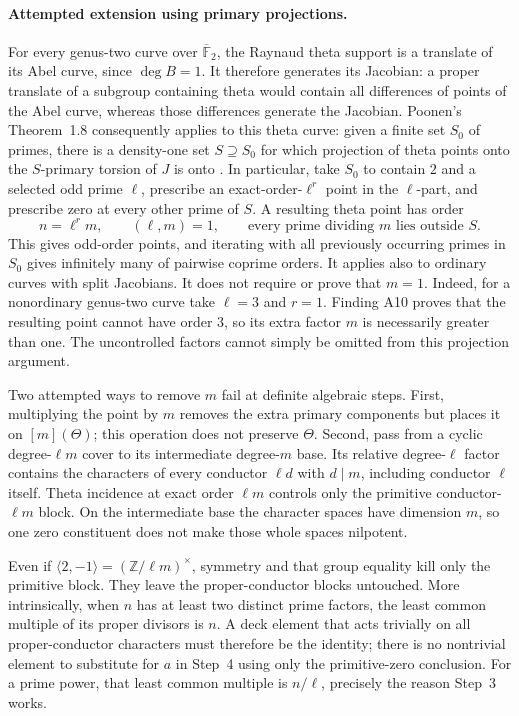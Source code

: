 \documentclass[11pt,a4paper]{article}
\begin{document}
\paragraph{Attempted extension using primary projections.}
For every genus-two curve over $\overline{\mathbb F}_2$, the
Raynaud theta support is a translate of its Abel curve, since
$\deg B=1$. It therefore generates its Jacobian: a proper translate
of a subgroup containing theta would contain all differences of
points of the Abel curve, whereas those differences generate the
Jacobian.
Poonen's Theorem~1.8 consequently applies to this theta curve:
given a finite set $S_0$ of primes, there is a density-one set
$S\supseteq S_0$ for which projection of theta points onto the
$S$-primary torsion of $J$ is onto \cite[Theorem~1.8]{Poonen2005}.
In particular, take $S_0$ to contain $2$ and a selected odd prime
$\ell$, prescribe an exact-order-$\ell^r$ point in the $\ell$-part,
and prescribe zero at every other prime of $S$. A resulting theta
point has order
\[
 n=\ell^r m,\qquad (\ell,m)=1,\qquad
 \text{every prime dividing }m\text{ lies outside }S.
 \tag{PR.9}
\]
This gives odd-order points, and iterating with all previously
occurring primes in $S_0$ gives infinitely many of pairwise coprime
orders. It applies also to ordinary curves with split Jacobians.
It does not require or prove that $m=1$.
Indeed, for a nonordinary genus-two curve take $\ell=3$ and $r=1$.
Finding A10 proves that the resulting point cannot have order $3$,
so its extra factor $m$ is necessarily greater than one. The
uncontrolled factors cannot simply be omitted from this projection
argument.

Two attempted ways to remove $m$ fail at definite algebraic steps.
First, multiplying the point by $m$ removes the extra primary
components but places it on $[m](\Theta)$; this operation does not
preserve $\Theta$. Second, pass from a cyclic degree-$\ell m$
cover to its intermediate degree-$m$ base. Its relative
degree-$\ell$ factor contains the characters of every conductor
$\ell d$ with $d\mid m$, including conductor $\ell$ itself.
Theta incidence at exact order $\ell m$ controls only the
primitive conductor-$\ell m$ block. On the intermediate base the
character spaces have dimension $m$, so one zero constituent does
not make those whole spaces nilpotent.

Even if $\langle2,-1\rangle=(\mathbb Z/\ell m)^\times$, symmetry
and that group equality kill only the primitive block. They leave
the proper-conductor blocks untouched. More intrinsically, when
$n$ has at least two distinct prime factors, the least common
multiple of its proper divisors is $n$. A deck element that acts
trivially on all proper-conductor characters must therefore be
the identity; there is no nontrivial element to substitute for
$a$ in Step~4 using only the primitive-zero conclusion. For a prime
power, that least common multiple is $n/\ell$, precisely the
reason Step~3 works.
\end{document}
